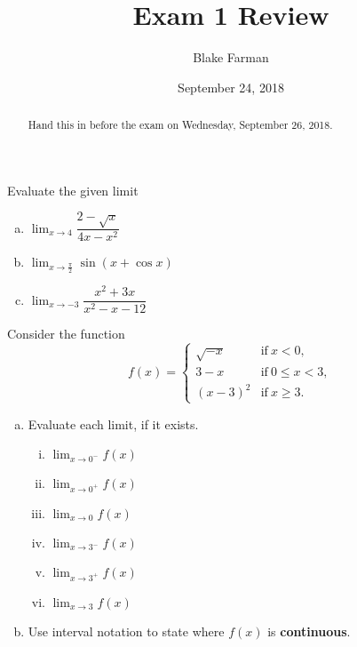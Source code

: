 \documentclass[10pt]{amsart}
\title[Review]{Exam 1 Review}
\date{September 24, 2018}
\author{Blake Farman}
\begin{document}
\maketitle

\begin{abstract}
  Hand this in before the exam on Wednesday, September 26, 2018.
\end{abstract}
\makenameslot

\begin{thm}
  Evaluate the given limit
  \begin{multicols}{3}
    \begin{enumerate}[(a)]
    \item
      \(\displaystyle{\lim_{x\to 4} \dfrac{2-\sqrt{x}}{4x-x^2}}\)
    \item
      \(\displaystyle{\lim_{x\to \frac{\pi}{2}} \sin(x+\cos x)}\)
    \item
      \(\displaystyle{\lim_{x\to -3}\dfrac{x^2+3x}{x^2-x-12}}\)
    \end{enumerate}
  \end{multicols}
\end{thm}

\vspace{1.5in}

\begin{thm}
  Consider the function
  \[
  f(x) = \left\{\begin{array}{ll}
  \sqrt{-x} & \text{if}\ x< 0, \\
  3-x & \text{if}\ 0\leq x< 3, \\
  (x-3)^2 & \text{if}\ x\geq 3.
  \end{array}
  \right.
  \]
  \begin{enumerate}[(a)]
  \item Evaluate each limit, if it exists.
    \begin{multicols}{3}
      \begin{enumerate}[(i)]
      \item
        $\lim_{x\to 0^-} f(x)$
        \vspace{1in}
      \item
        $\lim_{x\to 0^+} f(x)$
        \vspace{1in}
      \item
        $\lim_{x\to 0} f(x)$
        \vspace{1in}
      \item
        $\lim_{x\to 3^-} f(x)$
        \vspace{1in}
      \item
        $\lim_{x\to 3^+} f(x)$
        \vspace{1in}
      \item
        $\lim_{x\to 3} f(x)$
        \vspace{1in}
      \end{enumerate}
    \end{multicols}
  \item Use interval notation to state where $f(x)$ is \textbf{continuous}.
    \vspace{1 in}
  \end{enumerate}
\end{thm}
\end{document}
